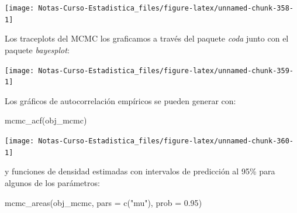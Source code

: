 \documentclass[
  12pt,
]{book}
\newenvironment{Shaded}{\begin{snugshade}}{\end{snugshade}}
\newcommand{\AttributeTok}[1]{\textcolor[rgb]{0.77,0.63,0.00}{#1}}
\newcommand{\DecValTok}[1]{\textcolor[rgb]{0.00,0.00,0.81}{#1}}
\newcommand{\FloatTok}[1]{\textcolor[rgb]{0.00,0.00,0.81}{#1}}
\newcommand{\FunctionTok}[1]{\textcolor[rgb]{0.00,0.00,0.00}{#1}}
\newcommand{\NormalTok}[1]{#1}
\newcommand{\OtherTok}[1]{\textcolor[rgb]{0.56,0.35,0.01}{#1}}
\newcommand{\SpecialCharTok}[1]{\textcolor[rgb]{0.00,0.00,0.00}{#1}}
\newcommand{\StringTok}[1]{\textcolor[rgb]{0.31,0.60,0.02}{#1}}
\theoremstyle{definition}
\theoremstyle{definition}
\theoremstyle{definition}
\theoremstyle{definition}
\theoremstyle{remark}
\begin{document}
\begin{center}\texttt{[image: Notas-Curso-Estadistica\_files/figure-latex/unnamed-chunk-358-1]} \end{center}

Los traceplots del MCMC los graficamos a través del paquete \emph{coda} junto con el paquete \emph{bayesplot}:

\begin{Shaded}
\end{Shaded}

\begin{center}\texttt{[image: Notas-Curso-Estadistica\_files/figure-latex/unnamed-chunk-359-1]} \end{center}

Los gráficos de autocorrelación empíricos se pueden generar con:

\begin{Shaded}
\begin{Highlighting}[]
\FunctionTok{mcmc\_acf}\NormalTok{(obj\_mcmc)}
\end{Highlighting}
\end{Shaded}

\begin{center}\texttt{[image: Notas-Curso-Estadistica\_files/figure-latex/unnamed-chunk-360-1]} \end{center}

y funciones de densidad estimadas con intervalos de predicción al 95\% para algunos de los parámetros:

\begin{Shaded}
\begin{Highlighting}[]
\FunctionTok{mcmc\_areas}\NormalTok{(obj\_mcmc, }\AttributeTok{pars =} \FunctionTok{c}\NormalTok{(}\StringTok{"mu"}\NormalTok{), }\AttributeTok{prob =} \FloatTok{0.95}\NormalTok{)}
\end{Highlighting}
\end{Shaded}
\end{document}
